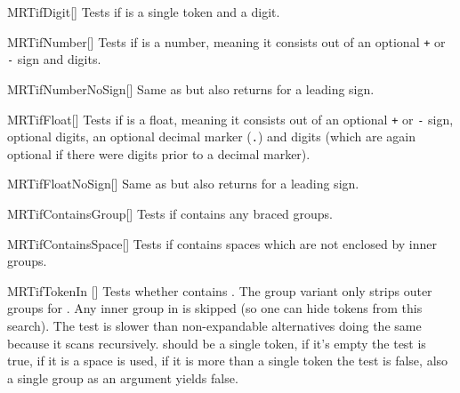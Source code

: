\begin{describemacroTF}[G,N,GN]{MRTifDigit}[]
  Tests if  is a single token and a digit.
\end{describemacroTF}

\begin{describemacroTF}[G,N,GN]{MRTifNumber}[]
  Tests if  is a number, meaning it consists out of an optional
  \texttt{+} or \texttt{-} sign and digits.
\end{describemacroTF}

\begin{describemacroTF}[G,N,GN]{MRTifNumberNoSign}[]
  Same as  but also returns  for a leading sign.
\end{describemacroTF}

\begin{describemacroTF}[G,N,GN]{MRTifFloat}[]
  Tests if  is a float, meaning it consists out of an optional
  \texttt{+} or \texttt{-} sign, optional digits, an optional decimal marker
  (\texttt{.}) and digits (which are again optional if there were digits prior
  to a decimal marker).
\end{describemacroTF}

\begin{describemacroTF}[G,N,GN]{MRTifFloatNoSign}[]
  Same as  but also returns  for a leading sign.
\end{describemacroTF}

\begin{describemacroTF}[G,N,GN]{MRTifContainsGroup}[]
  Tests if  contains any braced groups.
\end{describemacroTF}

\begin{describemacroTF}[G,N,GN]{MRTifContainsSpace}[]
  Tests if  contains spaces which are not enclosed by inner groups.
\end{describemacroTF}

\begin{describemacroTF}{MRTifTokenIn}
  []
  Tests whether  contains . The group variant only
  strips outer groups for . Any inner group in  is skipped (so one can hide tokens from this search). The test is slower
  than non-expandable alternatives doing the same because it scans  recursively.  should be a single token, if it's empty the
  test is true, if it is a space  is used, if it is
  more than a single token the test is false, also a single group as an argument
  yields false.
\end{describemacroTF}

